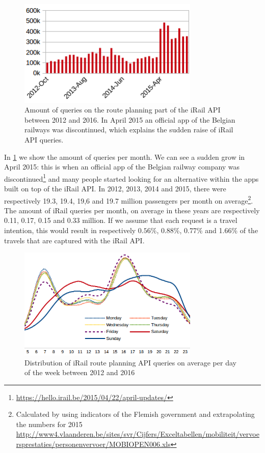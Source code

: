 \documentclass{sig-alternate}
\begin{document}
\begin{figure}
\centering
\includegraphics[width=8.6cm]{querylogs}
\caption{Amount of queries on the route planning part of the iRail API between 2012 and 2016. In April 2015 an official app of the Belgian railways was discontinued, which explains the sudden raise of iRail API queries.}
\label{fig:querylogs}
\end{figure}

In \cref{fig:querylogs} we show the amount of queries per month.
We can see a sudden grow in April 2015: this is when an official app of the Belgian railway company was discontinued\footnote{\url{https://hello.irail.be/2015/04/22/april-updates/}} and many people started looking for an alternative within the apps built on top of the iRail API.
In 2012, 2013, 2014 and 2015, there were respectively 19.3, 19.4, 19,6 and 19.7 million passengers per month on average\footnote{Calculated by using indicators of the Flemish government and extrapolating the numbers for 2015 \url{http://www4.vlaanderen.be/sites/svr/Cijfers/Exceltabellen/mobiliteit/vervoersprestaties/personenvervoer/MOBIOPEN006.xls}}.
The amount of iRail queries per month, on average in these years are respectively 0.11, 0.17, 0.15 and 0.33 million.
If we assume that each request is a travel intention, this would result in respectively $0.56\%$, 0.88\%, 0.77\% and 1.66\% of the travels that are captured with the iRail API.

\begin{figure}
\centering
\includegraphics[width=8.6cm]{avg-all}
\caption{Distribution of iRail route planning API queries on average per day of the week between 2012 and 2016}
\label{fig:average}
\end{figure}
\end{document}

